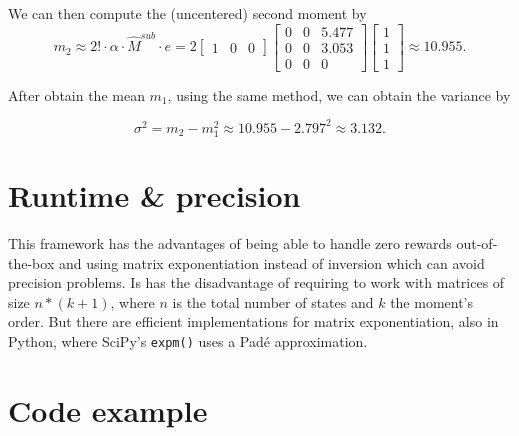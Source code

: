 \documentclass[hidelinks,11pt]{article}
\begin{document}
    We can then compute the (uncentered) second moment by
    \begin{equation*}
        m_2 \approx 2! \cdot \alpha \cdot \hat{M}^{sub}\cdot e = 2 \left [
            \begin{array}{ccc}
                1 & 0 & 0
            \end{array}
            \right ] \left [
            \begin{array}{ccc}
                0 & 0 & 5.477 \\
                0 & 0 & 3.053 \\
                0 & 0 & 0
            \end{array}
            \right ] \left [
            \begin{array}{c}
                1 \\ 1 \\ 1
            \end{array}
            \right ] \approx 10.955.
    \end{equation*}

    After obtain the mean $m_1$, using the same method, we can obtain the variance by

    \begin{equation*}
        \sigma^2 = m_2 - m_1^2 \approx 10.955 - 2.797^2 \approx 3.132.
    \end{equation*}


    \section{Runtime \& precision}\label{sec:runtime-&-precision}

    This framework has the advantages of being able to handle zero rewards out-of-the-box and using matrix exponentiation instead of inversion which can avoid precision problems.
    Is has the disadvantage of requiring to work with matrices of size $n * (k + 1)$, where $n$ is the total number of states and $k$ the moment's order.
    But there are efficient implementations for matrix exponentiation, also in Python, where SciPy's \texttt{expm()} uses a Padé approximation.


    \section{Code example}\label{sec:code-example}
\end{document}
